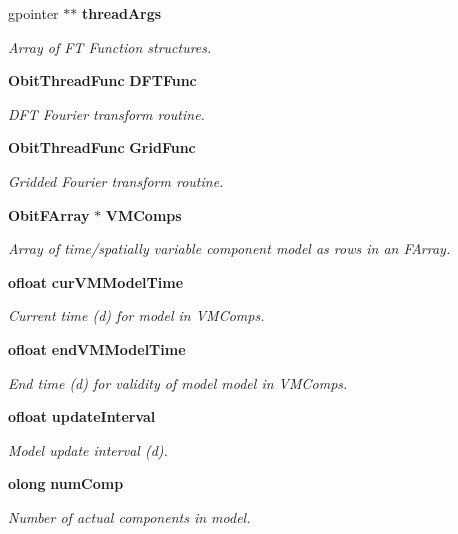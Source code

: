 \begin{CompactItemize}
gpointer $\ast$$\ast$ {\bf thread\-Args}
\begin{CompactList}\small\item\em Array of FT Function structures. \item\end{CompactList}\item 
{\bf Obit\-Thread\-Func} {\bf DFTFunc}
\begin{CompactList}\small\item\em DFT Fourier transform routine. \item\end{CompactList}\item 
{\bf Obit\-Thread\-Func} {\bf Grid\-Func}
\begin{CompactList}\small\item\em Gridded Fourier transform routine. \item\end{CompactList}\item 
{\bf Obit\-FArray} $\ast$ {\bf VMComps}
\begin{CompactList}\small\item\em Array of time/spatially variable component model as rows in an FArray. \item\end{CompactList}\item 
{\bf ofloat} {\bf cur\-VMModel\-Time}
\begin{CompactList}\small\item\em Current time (d) for model in VMComps. \item\end{CompactList}\item 
{\bf ofloat} {\bf end\-VMModel\-Time}
\begin{CompactList}\small\item\em End time (d) for validity of model model in VMComps. \item\end{CompactList}\item 
{\bf ofloat} {\bf update\-Interval}
\begin{CompactList}\small\item\em Model update interval (d). \item\end{CompactList}\item 
{\bf olong} {\bf num\-Comp}
\begin{CompactList}\small\item\em Number of actual components in model. \item\end{CompactList}\item 
$$
\end{CompactItemize}
